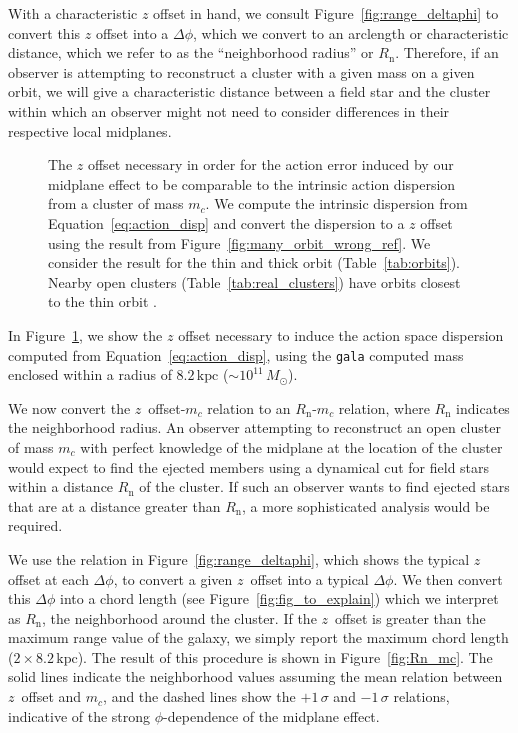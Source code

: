 \documentclass[twocolumn]{aastex62}
\newcommand{\kpc}{\text{kpc}}
\newcommand{\n}{\text{n}}
\begin{document}
With a characteristic $z$ offset in hand, we consult
Figure~\ref{fig:range_deltaphi} to convert this $z$ offset into a $\Delta
\phi$, which we convert to an arclength or characteristic distance, which we
refer to as the ``neighborhood radius'' or $R_{\n}$. Therefore, if an observer
is attempting to reconstruct a cluster with a given mass on a given orbit, we
will give a characteristic distance between a field star and the cluster
within which an observer might not need to consider differences in their
respective local midplanes.

\begin{figure}
\caption{The $z$ offset necessary in order for the action error induced by our
midplane effect to be comparable to the intrinsic action dispersion from a
cluster of mass $m_c$. We compute the intrinsic dispersion from
Equation~\ref{eq:action_disp} and convert the dispersion to a $z$ offset using
the result from Figure~\ref{fig:many_orbit_wrong_ref}. We consider the result
for the thin and thick orbit (Table~\ref{tab:orbits}). Nearby open clusters
(Table~\ref{tab:real_clusters}) have orbits closest to the thin orbit .}
\label{fig:cluster_offset}
\end{figure}

In Figure~\ref{fig:cluster_offset}, we show the $z$ offset necessary to induce
the action space dispersion computed from Equation~\ref{eq:action_disp}, using
the \texttt{gala} computed mass enclosed within a radius of $8.2\,\kpc$ ($\sim
10^{11}\,M_{\odot}$).

We now convert the $z$~offset-$m_c$ relation to an $R_{\n}$-$m_c$ relation,
where $R_{\n}$ indicates the neighborhood radius. An observer
attempting to reconstruct an open cluster of mass $m_c$ with perfect knowledge
of the midplane at the location of the cluster would expect to find the
ejected members using a dynamical cut for field stars within a distance
$R_{\n}$ of the cluster. If such an observer wants to find ejected stars that
are at a distance greater than $R_{\n}$, a more sophisticated analysis would
be required.

We use the relation in Figure~\ref{fig:range_deltaphi}, which shows the
typical $z$ offset at each $\Delta \phi$, to convert a given $z$~offset into a
typical $\Delta\phi$. We then convert this $\Delta \phi$ into a chord length
(see Figure~\ref{fig:fig_to_explain}) which we interpret as $R_{\n}$, the
neighborhood around the cluster. If the $z$~offset is greater than the maximum
range value of the galaxy, we simply report the maximum chord length
($2\times8.2\,\kpc$). The result of this procedure is shown in
Figure~\ref{fig:Rn_mc}. The solid lines indicate the neighborhood values
assuming the mean relation between $z$~offset and $m_c$, and the dashed lines
show the $+1\,\sigma$ and $-1\,\sigma$ relations, indicative of the strong
$\phi$-dependence of the midplane effect.
\end{document}

